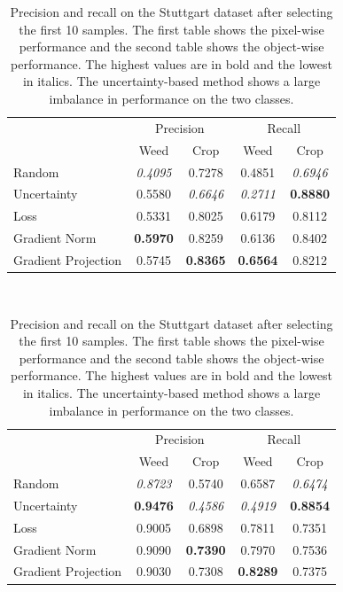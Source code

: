 \documentclass[letterpaper, 10 pt, conference]{ieeeconf}  %
\begin{document}
       \begin{table}
        \vspace{1em}
        \centering
      \caption{Precision and recall on the Stuttgart dataset after selecting the first 10 samples. The first table shows the pixel-wise performance and the second table shows the object-wise performance. The highest values are in bold and the lowest in italics. The uncertainty-based method shows a large imbalance in performance on the two classes.}
        \begin{tabular}{@{}lcccc@{}} 
            \toprule
            & \multicolumn{2}{c}{Precision} & \multicolumn{2}{c}{Recall}\\ 
           \cmidrule{2-5} 
               & Weed & Crop & Weed & Crop \\ 
            \midrule 
    		  Random & \textit{0.4095} & 0.7278 & 0.4851 & \textit{0.6946}  \\ \addlinespace
    		  Uncertainty & 0.5580 & \textit{0.6646} & \textit{0.2711} & \textbf{0.8880}  \\ \addlinespace
    		  Loss & 0.5331 & 0.8025 & 0.6179 & 0.8112  \\ \addlinespace
    		  Gradient Norm & \textbf{0.5970} & 0.8259 & 0.6136 & 0.8402  \\ \addlinespace
    		  Gradient Projection & 0.5745 & \textbf{0.8365} & \textbf{0.6564} & 0.8212  \\ 
            \bottomrule
        \end{tabular}
           ~\\[1mm]
                \begin{tabular}{@{}lcccc@{}} 
            \toprule
            & \multicolumn{2}{c}{Precision} & \multicolumn{2}{c}{Recall}\\ 
           \cmidrule{2-5} 
               & Weed & Crop & Weed & Crop \\ 
            \midrule 
    		  Random & \textit{0.8723} & 0.5740 & 0.6587 & \textit{0.6474}  \\ \addlinespace
    		  Uncertainty & \textbf{0.9476} & \textit{0.4586} & \textit{0.4919} & \textbf{0.8854}  \\ \addlinespace
    		  Loss & 0.9005 & 0.6898 & 0.7811 & 0.7351  \\ \addlinespace
    		  Gradient Norm & 0.9090 & \textbf{0.7390} & 0.7970 & 0.7536  \\ \addlinespace
    		  Gradient Projection & 0.9030 & 0.7308 & \textbf{0.8289} & 0.7375  \\ 
            \bottomrule
        \end{tabular}
        \label{tab:performance_10_stuttgart}
    \end{table}
   
\end{document}
